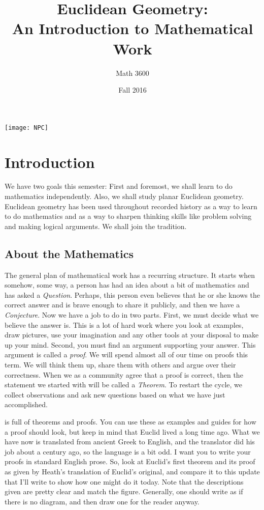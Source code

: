 \documentclass{tufte-handout}
\title{Euclidean Geometry:\\An Introduction to Mathematical Work}
\author[Math 3600]{Math 3600}
\date{Fall 2016}
\theoremstyle{definition}
\begin{document}
\maketitle

\begin{marginfigure}
    \texttt{[image: NPC]}
\end{marginfigure}


\section*{Introduction}

We have two goals this semester:
First and foremost, we shall learn to do mathematics independently.
Also, we shall study planar Euclidean geometry.
Euclidean geometry has been used throughout recorded history as a way to learn to do mathematics and as a way to sharpen thinking skills like problem solving and making logical arguments.
We shall join the tradition.

\subsection*{About the Mathematics}
The general plan of mathematical work has a recurring structure.
It starts when somehow, some way, a person has had an idea about a bit of mathematics and has asked a \emph{Question}.
Perhaps, this person even believes that he or she knows the correct answer and is brave enough to share it publicly, and then we have a \emph{Conjecture}.
Now we have a job to do in two parts.
First, we must decide what we believe the answer is.
This is a lot of hard work where you look at examples, draw pictures, use your imagination and any other tools at your disposal to make up your mind.
Second, you must find an argument supporting your answer.
This argument is called a \emph{proof}.
We will spend almost all of our time on proofs this term. We will think them up, share them with others and argue over their correctness.
When we as a community agree that a proof is correct, then the statement we started with will be called a \emph{Theorem}.
To restart the cycle, we collect observations and ask new questions based on what we have just accomplished.

 is full of theorems and proofs.
 You can use these as examples and guides for how a proof should look, but keep in mind that Euclid lived a long time ago.
 What we have now is translated from ancient Greek to English, and the translator did his job about a century ago, so the language is a bit odd.
I want you to write your proofs in standard English prose.
So, look at Euclid's first theorem and its proof as given by Heath's translation of Euclid's original, and compare it to this update that I'll write to show how one might do it today.
Note that the descriptions given are pretty clear and match the figure.
Generally, one should write as if there is no diagram, and then draw one for the reader anyway.
\end{document}
